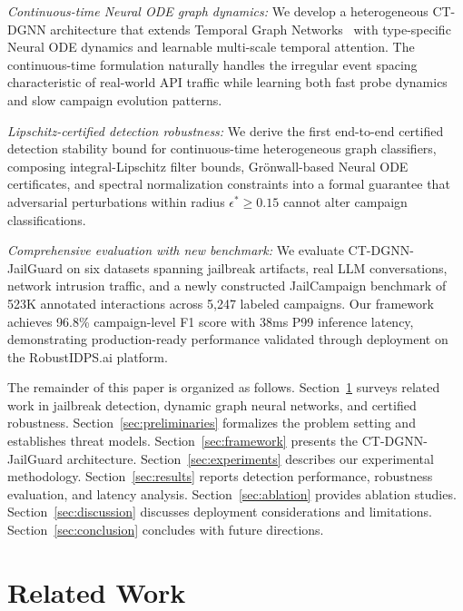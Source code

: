 \documentclass[journal]{IEEEtran}
\theoremstyle{plain}
\theoremstyle{definition}
\theoremstyle{remark}
\begin{document}
\textit{Continuous-time Neural ODE graph dynamics:} We develop a heterogeneous CT-DGNN architecture that extends Temporal Graph Networks~\cite{rossi2020tgn} with type-specific Neural ODE dynamics and learnable multi-scale temporal attention. The continuous-time formulation naturally handles the irregular event spacing characteristic of real-world API traffic while learning both fast probe dynamics and slow campaign evolution patterns.

\textit{Lipschitz-certified detection robustness:} We derive the first end-to-end certified detection stability bound for continuous-time heterogeneous graph classifiers, composing integral-Lipschitz filter bounds, Gr\"onwall-based Neural ODE certificates, and spectral normalization constraints into a formal guarantee that adversarial perturbations within radius $\epsilon^* \geq 0.15$ cannot alter campaign classifications.

\textit{Comprehensive evaluation with new benchmark:} We evaluate CT-DGNN-JailGuard on six datasets spanning jailbreak artifacts, real LLM conversations, network intrusion traffic, and a newly constructed JailCampaign benchmark of 523K annotated interactions across 5,247 labeled campaigns. Our framework achieves 96.8\% campaign-level F1 score with 38ms P99 inference latency, demonstrating production-ready performance validated through deployment on the RobustIDPS.ai platform.

The remainder of this paper is organized as follows. Section~\ref{sec:related} surveys related work in jailbreak detection, dynamic graph neural networks, and certified robustness. Section~\ref{sec:preliminaries} formalizes the problem setting and establishes threat models. Section~\ref{sec:framework} presents the CT-DGNN-JailGuard architecture. Section~\ref{sec:experiments} describes our experimental methodology. Section~\ref{sec:results} reports detection performance, robustness evaluation, and latency analysis. Section~\ref{sec:ablation} provides ablation studies. Section~\ref{sec:discussion} discusses deployment considerations and limitations. Section~\ref{sec:conclusion} concludes with future directions.

\section{Related Work}
\label{sec:related}
\end{document}
